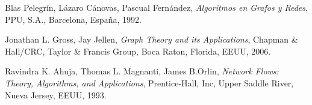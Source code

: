 \begin{thebibliography}{9}

Blas Pelegrín, Lázaro Cánovas, Pascual Fernández,
{\em Algoritmos en Grafos y Redes},
PPU, S.A., Barcelona, España, 1992.

Jonathan L. Gross, Jay Jellen,
{\em Graph Theory and its Applications},
Chapman \& Hall/CRC, Taylor \& Francis Group, Boca Raton, Florida, EEUU, 2006.

Ravindra K. Ahuja, Thomas L. Magnanti, James B.Orlin,
{\em Network Flows: Theory, Algorithms, and Applications},
Prentice-Hall, Inc, Upper Saddle River, Nueva Jersey, EEUU, 1993.


\end{thebibliography}